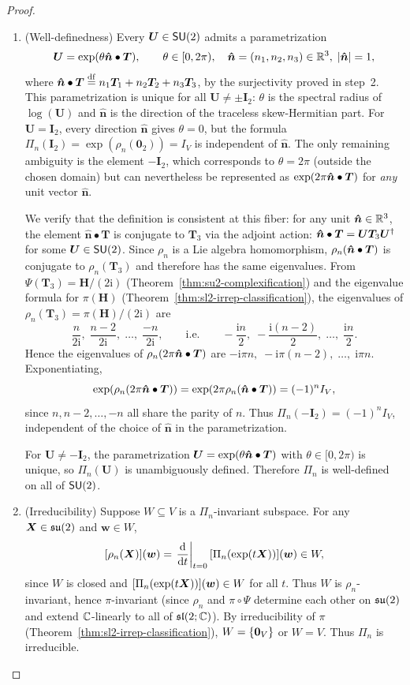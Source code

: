 \documentclass[11pt,reqno]{amsart}
\newcommand{\ii}{\mathrm{i}}
\begin{document}
\begin{proof}
\begin{enumerate}
\item (Well-definedness)
Every $\bm U\in\operatorname{\mathsf{SU}}(2)$ admits a parametrization
\[
\bm U=\exp\Br{\theta\bm{\hat n}\bullet\bm T},\qquad
\theta\in[0,2\pi),\quad
\bm{\hat n}=(n_1,n_2,n_3)\in\R^3,\;
\abs{\bm{\hat n}}=1,
\]
where $\bm{\hat n}\bullet\bm T\stackrel{\mathrm{df}}{=} n_1\bm T_1+n_2\bm T_2+n_3\bm T_3$,
by the surjectivity proved in step~2.
This parametrization is unique for all $\bm U\neq\pm\bm I_2$:
$\theta$ is the spectral radius of $\log(\bm U)$ and $\bm{\hat n}$ is
the direction of the traceless skew-Hermitian part.
For $\bm U=\bm I_2$, every direction $\bm{\hat n}$ gives $\theta=0$,
but the formula $\Pi_n(\bm I_2)=\exp(\rho_n(\bm0_2))=I_V$ is
independent of $\bm{\hat n}$.
The only remaining ambiguity is the element $-\bm I_2$, which
corresponds to $\theta=2\pi$ (outside the chosen domain) but
can nevertheless be represented as
$\exp\Br{2\pi\bm{\hat n}\bullet\bm T}$ for \emph{any} unit vector $\bm{\hat n}$.

We verify that the definition is consistent at this fiber:
for any unit $\bm{\hat n}\in\mathbb{R}^3$, the element $\bm{\hat n}\bullet\bm T$ is
conjugate to $\bm T_3$ via the adjoint action:
$\bm{\hat n}\bullet\bm T=\bm U\bm T_3\bm U^{\dagger}$ for some $\bm U\in\operatorname{\mathsf{SU}}(2)$.
Since $\rho_n$ is a Lie algebra homomorphism,
$\rho_n\Br{\bm{\hat n}\bullet\bm T}$ is conjugate to $\rho_n(\bm T_3)$
and therefore has the same eigenvalues.
From $\Psi(\bm T_3)=\bm H/(2\ii)$
(Theorem~\ref{thm:su2-complexification}) and the eigenvalue
formula for $\pi(\bm H)$
(Theorem~\ref{thm:sl2-irrep-classification}),
the eigenvalues of $\rho_n(\bm T_3)=\pi(\bm H)/(2\ii)$ are
\[
\frac{n}{2\ii},\;\frac{n-2}{2\ii},\;\dots,\;\frac{-n}{2\ii},
\qquad\text{i.e.}\qquad
-\frac{\ii n}{2},\;-\frac{\ii(n-2)}{2},\;\dots,\;\frac{\ii n}{2}.
\]
Hence the eigenvalues of $\rho_n\Br{2\pi\bm{\hat n}\bullet\bm T}$ are
$-\ii\pi n,\;-\ii\pi(n-2),\;\dots,\;\ii\pi n$.
Exponentiating,
\[
\exp\Br{\rho_n(2\pi\bm{\hat n}\bullet\bm T)}
=\exp\Br{2\pi\rho_n\Br{\bm{\hat n}\bullet\bm T}}
=(-1)^n I_V,
\]
since $n,n-2,\dots,-n$ all share the parity of $n$.
Thus $\Pi_n(-\bm I_2)=(-1)^n I_V$, independent of the choice of
$\bm{\hat n}$ in the parametrization.

For $\bm U\neq-\bm I_2$, the parametrization $\bm U=\exp\Br{\theta\bm{\hat n}\bullet\bm T}$
with $\theta\in[0,2\pi)$ is unique, so $\Pi_n(\bm U)$ is
unambiguously defined.
Therefore $\Pi_n$ is well-defined on all of $\operatorname{\mathsf{SU}}(2)$.

\item (Irreducibility)
Suppose $W\subseteq V$ is a $\Pi_n$-invariant subspace.
For any $\bm X\in\mathfrak{su}(2)$ and $\bm w\in W$,
\[
\FUNC{\rho_n(\bm X)}{\bm w}
=\left.\frac{\dd}{\dd t}\right|_{t=0}
\FUNC{\Pi_n(\exp(t\bm X))}{\bm w}\in W,
\]
since $W$ is closed and $\FUNC{\Pi_n(\exp(t\bm X))}{\bm w}\in W$ for all $t$.
Thus $W$ is $\rho_n$-invariant, hence $\pi$-invariant
(since $\rho_n$ and $\pi\circ\Psi$ determine each other on
$\mathfrak{su}(2)$ and extend $\mathbb{C}$-linearly to all of $\mathfrak{sl}(2;\mathbb{C})$).
By irreducibility of $\pi$ (Theorem~\ref{thm:sl2-irrep-classification}),
$W=\set{\bm0_V}$ or $W=V$.
Thus $\Pi_n$ is irreducible.


\end{enumerate}
\end{proof}
\end{document}
